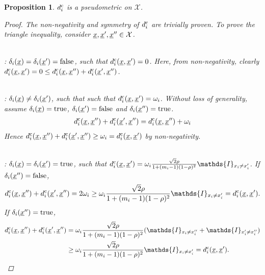 \documentclass{article}
\newcommand{\vect}[1]{\underline{\smash{#1}}}
\renewcommand{\v}[1]{\vect{#1}}
\newcommand{\sX}{\mathcal{X}}
\newcommand{\cat}{^{\text{\textnormal{c}}}}
\newtheorem{prop}[thm]{Proposition}
\newcommand{\indicator}{\ensuremath\mathds{I}}
\begin{document}
\begin{prop}
 $d\cat_i$ is a pseudometric on $\sX$.\label{prop:dbr_pseudometric_cat}
\begin{proof}
The non-negativity and symmetry of $d\cat_i$ are trivially proven. To prove the triangle inequality, consider $\v{x}, \v{x}', \v{x}'' \in \sX$. 

~\\: $\delta_i(\v{x}) = \delta_i(\v{x}') = \textrm{false}$, such that $d\cat_i(\v{x},\v{x}') = 0$. Here, from non-negativity, clearly $d\cat_i(\v{x},\v{x}') = 0 \leq d\cat_i(\v{x},\v{x}'') + d\cat_i(\v{x}',\v{x}'')$.

~\\: $\delta_i(\v{x}) \neq \delta_i(\v{x}')$, such that such that  $d\cat_i(\v{x},\v{x}') = \omega_i$.  Without loss of generality, assume $\delta_i(\v{x}) = \text{true}$, $\delta_i(\v{x}') = \text{false}$ and $\delta_i(\v{x}'') = \text{true}$. 
\begin{align}
d\cat_i(\v{x},\v{x}'') + d\cat_i(\v{x}',\v{x}'') = d\cat_i(\v{x},\v{x}'')  + \omega_i
\end{align}
Hence $d\cat_i(\v{x},\v{x}'') + d\cat_i(\v{x}',\v{x}'') \geq \omega_i = d\cat_i(\v{x},\v{x}')$ by non-negativity.

~\\: $\delta_i(\v{x}) = \delta_i(\v{x}')=\textrm{true}$, such that  $d\cat_i(\v{x},\v{x}') =
\omega_i \frac{\sqrt{2} \rho}
{1+(m_i-1)(1-\rho)^2}
 \indicator_{x_i \neq x_i'} $.  
If  $\delta_i(\v{x}'') = \text{false}$,
\begin{align}
d\cat_i(\v{x},\v{x}'') + d\cat_i(\v{x}',\v{x}'') = 
2 \omega_i 
\geq 
\omega_i \frac{\sqrt{2} \rho}
{1+(m_i-1)(1-\rho)^2}
 \indicator_{x_i \neq x_i'}  
= d\cat_i(\v{x},\v{x}').
\end{align} 
If  $\delta_i(\v{x}'') = \text{true}$, 
\begin{align}
d\cat_i(\v{x},\v{x}'') + d\cat_i(\v{x}',\v{x}'')
& = \omega_i \frac{\sqrt{2} \rho}
{1+(m_i-1)(1-\rho)^2}
(
 \indicator_{x_i \neq x_i''} 
+
 \indicator_{x_i' \neq x_i''} 
)
\nonumber\\
& \geq 
\omega_i \frac{\sqrt{2} \rho}
{1+(m_i-1)(1-\rho)^2}
 \indicator_{x_i \neq x_i'} = d\cat_i(\v{x},\v{x}').
\end{align}
\end{proof}
\end{prop}

%
\end{document}
